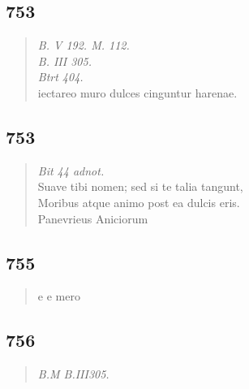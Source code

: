 \documentclass[11pt, a4paper]{report}
\begin{document}
            \subsection*{753}
      \begin{verse}
      \textit{B. V 192. M. 112.} \\ \textit{B. III 305.} \\ \textit{Btrt 404.} \\ iectareo muro dulces cinguntur harenae. \\ 
      \end{verse}
  
            \subsection*{753}
      \begin{verse}
      \textit{Bit 44 adnot.} \\ Suave tibi nomen; sed si te talia tangunt, \\ Moribus atque animo post ea dulcis eris. \\ Panevrieus Aniciorum \\ 
      \end{verse}
  
            \subsection*{755}
      \begin{verse}
      e e mero \\ 
      \end{verse}
  
            \subsection*{756}
      \begin{verse}
      \textit{B.M B.III305.} \\ 
      \end{verse}
  
\end{document}
